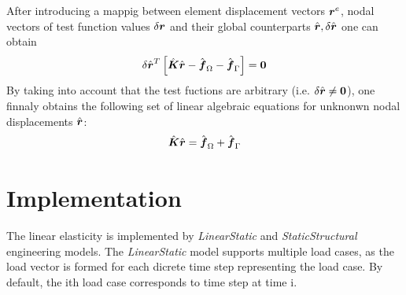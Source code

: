 \documentclass[11pt]{article}
\begin{document}
After introducing a mappig between element displacement vectors $\mbox{\boldmath$r$}^e$, nodal vectors of test function values $\delta\mbox{\boldmath$r$}$ and their global counterparts $\hat{\mbox{\boldmath$r$}}, \delta\hat{\mbox{\boldmath$r$}}$ one can obtain
\begin{equation}
  \delta\hat{\mbox{\boldmath$r$}}^{T}
  \left[
    \hat{\mbox{\boldmath$K$}}\hat{\mbox{\boldmath$r$}}-\hat{\mbox{\boldmath$f$}}_\Omega - \hat{\mbox{\boldmath$f$}}_{\Gamma}
    \right] = \mbox{\boldmath$0$}
\end{equation}
By taking into account that the test fuctions are arbitrary (i.e. $\delta\hat{\mbox{\boldmath$r$}}\ne\mbox{\boldmath$0$}$), one finnaly obtains the following set of linear algebraic equations for unknonwn nodal displacements $\hat{\mbox{\boldmath$r$}}$:
\begin{equation}
    \hat{\mbox{\boldmath$K$}}\hat{\mbox{\boldmath$r$}}=\hat{\mbox{\boldmath$f$}}_\Omega + \hat{\mbox{\boldmath$f$}}_{\Gamma}
\end{equation}

\section{Implementation}
The linear elasticity is implemented by {\em LinearStatic} and {\em StaticStructural} engineering models. The {\em LinearStatic} model supports multiple load cases, as the load vector is formed for each dicrete time step representing the load case. By default, the ith load case corresponds to time step at time i. 
\end{document}
